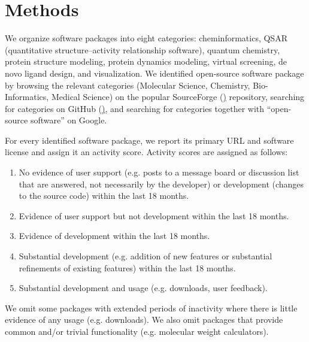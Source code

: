 \section{Methods}

We organize software packages into eight categories: cheminformatics, QSAR (quantitative structure–activity relationship software), quantum chemistry, protein structure modeling, protein dynamics modeling, virtual screening, de novo ligand design, and visualization.
We identified open-source software package by browsing the relevant categories (Molecular Science, Chemistry, Bio-Informatics, Medical Science) on the popular SourceForge (\href{http://sourceforge.net}) repository, searching for categories on GitHub (\href{http://github.com}), and searching for categories together with ``open-source software'' on Google.

For every identified software package, we report its primary URL and software license and assign it an activity score. Activity scores are assigned as follows: 
\begin{enumerate}
  \item No evidence of user support (e.g. posts to a message board or discussion list that are answered, not necessarily by the developer) or development (changes to the source code) within the last 18 months.
  \item Evidence of user support but not development within the last 18 months.
  \item Evidence of development within the last 18 months.
  \item Substantial development (e.g. addition of new features or substantial refinements of existing features) within the last 18 months.
  \item Substantial development and usage (e.g. downloads, user feedback).
\end{enumerate}

We omit some packages with extended periods of inactivity where there is little evidence of any usage (e.g. downloads).  We also omit packages that provide common and/or trivial functionality (e.g. molecular weight calculators).



 
 

  
  
